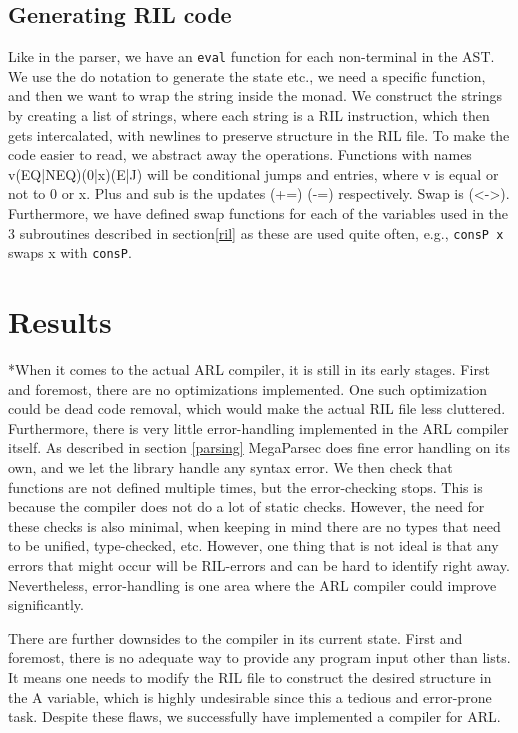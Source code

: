 \documentclass[a4paper]{article}
\begin{document}
\subsection{Generating RIL code}
\label{sec:orgfc55a8e}
Like in the parser, we have an \texttt{eval} function for each non-terminal in the AST. We use the do notation to generate the state etc., we need a specific function, and then we want to wrap the string inside the monad. We construct the strings by creating a list of strings, where each string is a RIL instruction, which then gets intercalated, with newlines to preserve structure in the RIL file. To make the code easier to read, we abstract away the operations. Functions with names v(EQ|NEQ)(0|x)(E|J) will be conditional jumps and entries, where v is equal or not to 0 or x. Plus and sub is the updates (+=) (-=) respectively. Swap is (<->). Furthermore, we have defined swap functions for each of the variables used in the 3 subroutines described in section\ref{ril} as these are used quite often, e.g., \texttt{consP x} swaps x with \texttt{consP}.

\section{Results}
\label{sec:org2b6c66f}
*When it comes to the actual ARL compiler, it is still in its early stages. First and foremost, there are no optimizations implemented. One such optimization could be dead code removal, which would make the actual RIL file less cluttered. Furthermore, there is very little error-handling implemented in the ARL compiler itself. As described in section \ref{parsing} MegaParsec does fine error handling on its own, and we let the library handle any syntax error. We then check that functions are not defined multiple times, but the error-checking stops. This is because the compiler does not do a lot of static checks. However, the need for these checks is also minimal, when keeping in mind there are no types that need to be unified, type-checked, etc. However, one thing that is not ideal is that any errors that might occur will be RIL-errors and can be hard to identify right away. Nevertheless, error-handling is one area where the ARL compiler could improve significantly.

There are further downsides to the compiler in its current state. First and foremost, there is no adequate way to provide any program input other than lists. It means one needs to modify the RIL file to construct the desired structure in the A variable, which is highly undesirable since this a tedious and error-prone task. Despite these flaws, we successfully have implemented a compiler for ARL.
\end{document}
